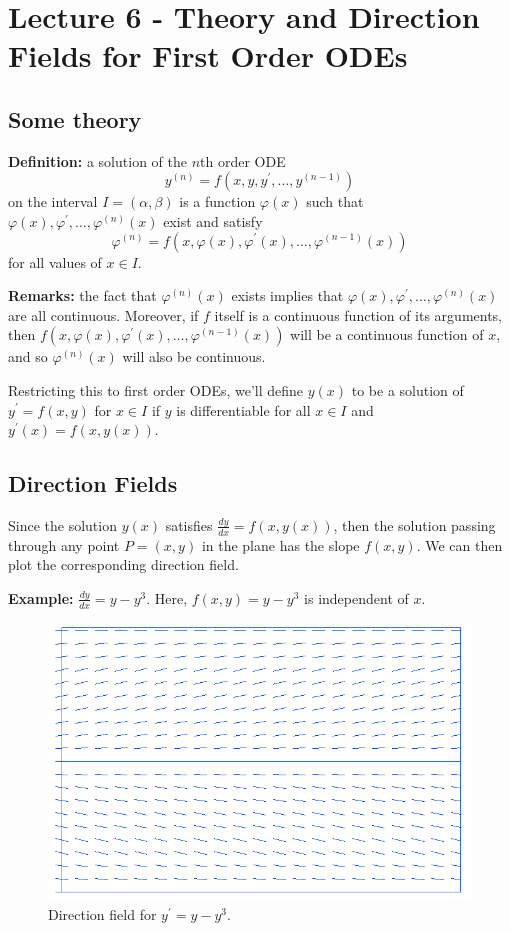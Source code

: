 \documentclass[11pt]{article}
\newcommand{\example}{\textbf{Example: }}
\newcommand{\definition}{\textbf{Definition: }}
\newcommand{\fdx}{\frac{dy}{dx}} %
\newcommand{\yp}{y^{\prime}}
\begin{document}
\section{Lecture 6 - Theory and Direction Fields for First Order ODEs}
\subsection{Some theory}
	\definition a solution of the $n$th order ODE
		$$ y^{(n)} = f(x,y,\yp,\ldots,y^{(n-1)}) $$
	on the interval $I = (\alpha, \beta)$ is a function $\varphi(x)$ such that $\varphi(x), \varphi^{\prime}, \ldots, \varphi^{(n)}(x)$ exist and satisfy
		$$ \varphi^{(n)} = f(x, \varphi(x), \varphi^{\prime}(x), \ldots, \varphi^{(n-1)}(x)) $$
	for all values of $x \in I$.

	\textbf{Remarks:} the fact that $\varphi^{(n)} (x)$ exists implies that $\varphi(x), \varphi^{\prime}, \ldots, \varphi^{(n)}(x)$ are all continuous. Moreover, if $f$ itself is a continuous function of its arguments, then $f(x, \varphi(x), \varphi^{\prime}(x), \ldots, \varphi^{(n-1)}(x))$ will be a continuous function of $x$, and so $\varphi^{(n)} (x)$ will also be continuous.

	Restricting this to first order ODEs, we'll define $y(x)$ to be a solution of $\yp = f(x,y)$ for $x \in I$ if $y$ is differentiable for all $x \in I$ and $\yp(x) = f(x, y(x))$.

\subsection{Direction Fields}
	Since the solution $y(x)$ satisfies $\fdx = f(x,y(x))$, then the solution passing through any point $P=(x,y)$ in the plane has the slope $f(x,y)$. We can then plot the corresponding direction field.

	\example $\fdx = y - y^3$. Here, $f(x,y) = y - y^3$ is independent of $x$.

	\begin{figure}[ht]
		\centering
		\includegraphics[scale=0.5]{L6directionfield1}
		\caption{Direction field for $\yp = y - y^3$.}
	\end{figure}
\end{document}
